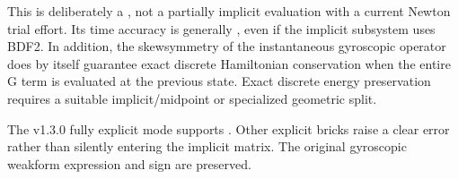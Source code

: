 \documentclass[letterpaper,10pt,english]{sphinxmanual}
\begin{document}
\sphinxAtStartPar
This is deliberately a , not a partially implicit
evaluation with a current Newton trial effort. Its time accuracy
is generally , even if the implicit subsystem uses
BDF2. In addition, the skew\sphinxhyphen{}symmetry of the instantaneous
gyroscopic operator does  by itself guarantee exact
discrete Hamiltonian conservation when the entire G term is
evaluated at the previous state. Exact discrete energy preservation
requires a suitable implicit/midpoint or specialized geometric split.

\sphinxAtStartPar
The v1.3.0 fully explicit mode supports . Other explicit bricks raise a clear
error rather than silently entering the implicit matrix.
The original gyroscopic weak\sphinxhyphen{}form expression and sign
are preserved.
\end{document}
